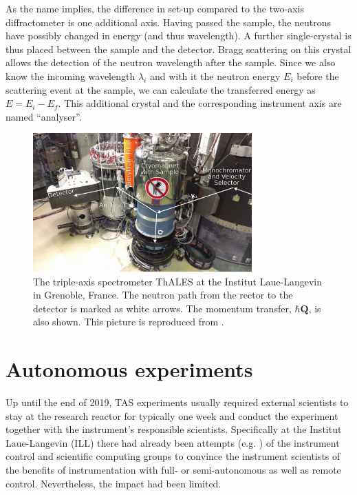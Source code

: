 As the name implies, the difference in set-up compared to the two-axis diffractometer is one additional axis. Having passed the sample, the neutrons have possibly changed in energy (and thus wavelength). A further single-crystal is thus placed between the sample and the detector. Bragg scattering on this crystal allows the detection of the neutron wavelength after the sample. Since we also know the incoming wavelength $\lambda_i$ and with it the neutron energy $E_i$ before the scattering event at the sample, we can calculate the transferred energy as $E = E_i - E_f$. This additional crystal and the corresponding instrument axis are named ``analyser''.

\begin{figure}[htb]
	\centering
	\includegraphics[width=0.75\textwidth]{figures/thales.jpg}
	\caption{The triple-axis spectrometer ThALES \cite{thales} at the Institut Laue-Langevin in Grenoble, France. The neutron path from the rector to the detector is marked as white arrows. The momentum transfer, $\hbar \bm{Q}$, is also shown. This picture is reproduced from \cite{skxpaper}.}
	\label{fig:thales}
\end{figure}



\section{Autonomous experiments \label{sec:autonomous}}

Up until the end of 2019, TAS experiments usually required external scientists to stay at the research reactor for typically one week and conduct the experiment together with the instrument's responsible scientists. Specifically at the Institut Laue-Langevin (ILL) there had already been attempts (e.g. \cite{Song2020}) of the instrument control and scientific computing groups to convince the instrument scientists of the benefits of instrumentation with full- or semi-autonomous as well as remote control. Nevertheless, the impact had been limited.

